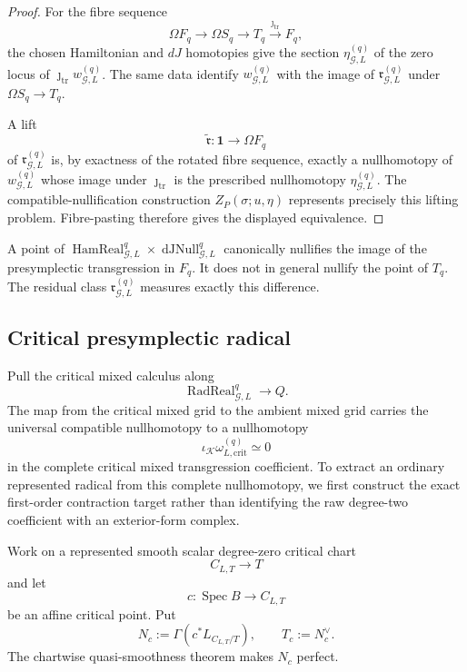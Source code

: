 \begin{proof}
For the fibre sequence
\[
\Omega F_q\longrightarrow\Omega S_q\longrightarrow T_q
\xrightarrow{\jmath_{\mathrm{tr}}}F_q,
\]
the chosen Hamiltonian and $dJ$ homotopies give the section
$\eta_{\mathcal G,L}^{(q)}$ of the zero locus of
$\jmath_{\mathrm{tr}}w_{\mathcal G,L}^{(q)}$.  The same data identify
$w_{\mathcal G,L}^{(q)}$ with the image of
$\mathfrak r_{\mathcal G,L}^{(q)}$ under $\Omega S_q\to T_q$.

A lift
\[
\widetilde{\mathfrak r}:\mathbf1\to\Omega F_q
\]
of $\mathfrak r_{\mathcal G,L}^{(q)}$ is, by exactness of the rotated fibre
sequence, exactly a nullhomotopy of $w_{\mathcal G,L}^{(q)}$ whose image under
$\jmath_{\mathrm{tr}}$ is the prescribed nullhomotopy
$\eta_{\mathcal G,L}^{(q)}$.  The compatible-nullification construction
$Z_P(\sigma;u,\eta)$ represents precisely this lifting problem.  Fibre-pasting
therefore gives the displayed equivalence.
\end{proof}

\begin{remark}
\label{rem:symmetry-noether-hamiltonianity-alone-is-weaker}
A point of
$\operatorname{HamReal}_{\mathcal G,L}^{q}
\times\operatorname{dJNull}_{\mathcal G,L}^{q}$
canonically nullifies the image of the presymplectic transgression in $F_q$.
It does not in general nullify the point of $T_q$.  The residual class
$\mathfrak r_{\mathcal G,L}^{(q)}$ measures exactly this difference.
\end{remark}

\subsection{Critical presymplectic radical}
\label{subsec:symmetry-noether-critical-presymplectic-radical}

Pull the critical mixed calculus along
\[
\operatorname{RadReal}_{\mathcal G,L}^{q}\longrightarrow Q.
\]
The map from the critical mixed grid to the ambient mixed grid carries the universal
compatible nullhomotopy to a nullhomotopy
\[
\iota_{\mathcal K}\omega_{L,\mathrm{crit}}^{(q)}\simeq0
\]
in the complete critical mixed transgression coefficient.  To extract an ordinary
represented radical from this complete nullhomotopy, we first construct the exact
first-order contraction target rather than identifying the raw degree-two
coefficient with an exterior-form complex.

Work on a represented smooth scalar degree-zero critical chart
\[
C_{L,T}\longrightarrow T
\]
and let
\[
c:\operatorname{Spec}B\longrightarrow C_{L,T}
\]
be an affine critical point.  Put
\[
N_c:=\Gamma\!\left(c^*L_{C_{L,T}/T}\right),
\qquad
T_c:=N_c^\vee.
\]
The chartwise quasi-smoothness theorem makes $N_c$ perfect.

